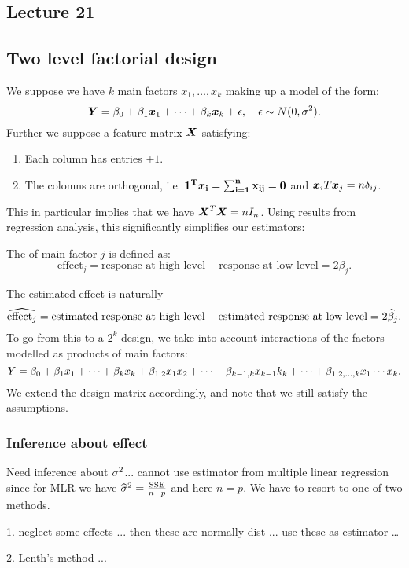 \subsection*{Lecture  21}
\subsection{Two level factorial design}

We suppose we have $k$ main factors $x_1,\dots,x_k$ making up a model of the form:
$$
    \boldsymbol{Y}=\beta_0 + \beta_1\boldsymbol{x}_1+\dots+\beta_k\boldsymbol{x}_k + \epsilon, \quad \epsilon\sim N(0, \sigma^2).
$$ 
Further we suppose a feature matrix $\boldsymbol{X}$ satisfying:
\begin{enumerate}
    \item Each column has entries $\pm 1$.
    \item The colomns are orthogonal, i.e. $\bf{1}^T\boldsymbol{x}_i=\sum_{i=1}^n x_{ij}=0$ and $\boldsymbol{x}_iT\boldsymbol{x}_j=n\delta_{ij}$. 
\end{enumerate}

This in particular implies that we have $\boldsymbol{X}^T \boldsymbol{X} = n I_n$. Using results from regression analysis, this significantly simplifies our estimators:


\begin{definition}
    The  of main factor $j$ is defined as:
    $$
        \textrm{effect}_j = \textrm{response at high level} - \textrm{response at low level} = 2\beta_j.
    $$
\end{definition}
The estimated effect is naturally
$$
    \widehat{\textrm{effect}_j} = \textrm{estimated response at high level} - \textrm{estimated response at low level} = 2\widehat{\beta}_j.
$$
To go from this to a $2^k$-design, we take into account interactions of the factors modelled as products of main factors:
$$
    Y = \beta_0 + \beta_1x_1+\dots+\beta_kx_k + \beta_{1,2}x_1x_2 + \dots+\beta_{k-1,k}x_{k-1}k_{k}+\dots+\beta_{1,2,\dots,k}x_1\cdots x_k.
$$
We extend the design matrix accordingly, and note that we still satisfy the assumptions. 


\subsubsection{Inference about effect}

Need inference about $\sigma^2$... cannot use estimator from multiple linear regression since for MLR we have $\widehat{\sigma}^2=\frac{\textrm{SSE}}{n-p}$ and here $n=p$. We have to resort to one of two methods.

1. neglect some effects ... then these are normally dist ... use these as estimator \dots

2. Lenth's method ...